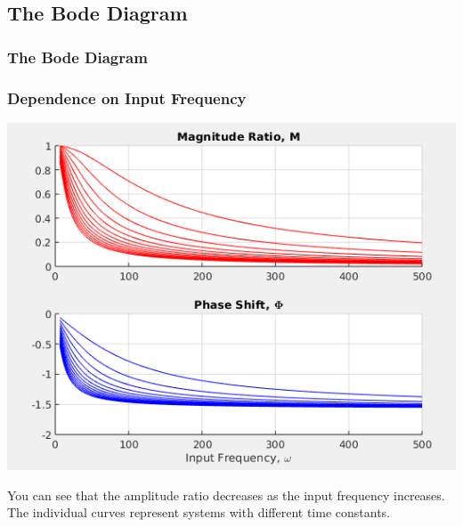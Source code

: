 \documentclass[fleqn]{beamer} %
\newcommand{\sectionIIsubsectionIIItitle}{The Bode Diagram}
\begin{document}
		\subsection{\sectionIIsubsectionIIItitle}\label{sectionIIsubsectionIII}

			\begin{frame}
				\frametitle{\sectionIIsubsectionIIItitle}
				\bigskip

				\frametitle{Dependence on Input Frequency}
				\begin{multicols}{2}

				\includegraphics[scale=.27]{images/lecture2_fig2.png}

				You can see that the amplitude ratio decreases as the input frequency increases. The individual curves represent systems with different time constants. 

				\end{multicols}
	
				\btVFill 
			\end{frame}	
\end{document}
